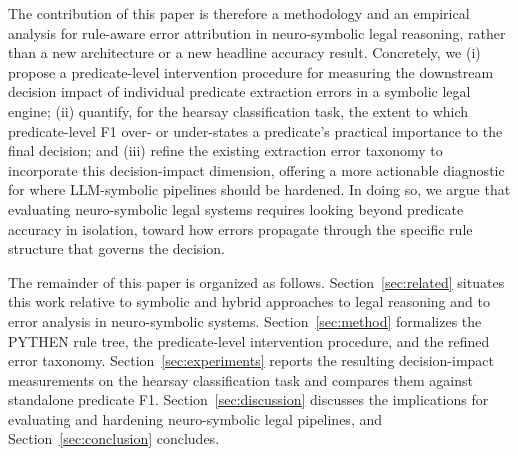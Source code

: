 The contribution of this paper is therefore a methodology and an empirical analysis for rule-aware error attribution in neuro-symbolic legal reasoning, rather than a new architecture or a new headline accuracy result. Concretely, we (i) propose a predicate-level intervention procedure for measuring the downstream decision impact of individual predicate extraction errors in a symbolic legal engine; (ii) quantify, for the hearsay classification task, the extent to which predicate-level F1 over- or under-states a predicate's practical importance to the final decision; and (iii) refine the existing extraction error taxonomy to incorporate this decision-impact dimension, offering a more actionable diagnostic for where LLM-symbolic pipelines should be hardened. In doing so, we argue that evaluating neuro-symbolic legal systems requires looking beyond predicate accuracy in isolation, toward how errors propagate through the specific rule structure that governs the decision.

The remainder of this paper is organized as follows. Section~\ref{sec:related} situates this work relative to symbolic and hybrid approaches to legal reasoning and to error analysis in neuro-symbolic systems. Section~\ref{sec:method} formalizes the PYTHEN rule tree, the predicate-level intervention procedure, and the refined error taxonomy. Section~\ref{sec:experiments} reports the resulting decision-impact measurements on the hearsay classification task and compares them against standalone predicate F1. Section~\ref{sec:discussion} discusses the implications for evaluating and hardening neuro-symbolic legal pipelines, and Section~\ref{sec:conclusion} concludes.
